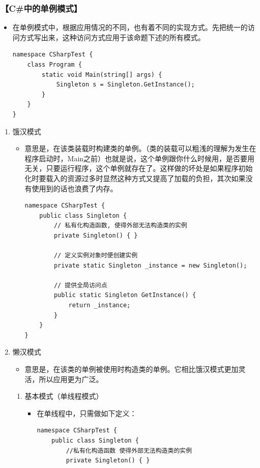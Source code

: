 \documentclass[9pt, b5paper]{article}
\begin{document}
\subsubsection{【C\#中的单例模式】}
\label{sec:org6edd41f}
\begin{itemize}
\item 在单例模式中，根据应用情况的不同，也有着不同的实现方式。先把统一的访问方式写出来，这种访问方式应用于该命题下述的所有模式。
\begin{verbatim}
namespace CSharpTest {
    class Program {
        static void Main(string[] args) {
            Singleton s = Singleton.GetInstance();
        }
    }
}
\end{verbatim}
\end{itemize}
\begin{enumerate}
\item 饿汉模式
\label{sec:org553a765}
\begin{itemize}
\item 意思是，在该类装载时构建类的单例。（类的装载可以粗浅的理解为发生在程序启动时，Main之前）也就是说，这个单例跟你什么时候用，是否要用无关，只要运行程序，这个单例就存在了。这样做的坏处是如果程序初始化时要载入的资源过多时显然这种方式又提高了加载的负担，其次如果没有使用到的话也浪费了内存。
\begin{verbatim}
namespace CSharpTest {
    public class Singleton {
        // 私有化构造函数, 使得外部无法构造类的实例
        private Singleton() { }

        // 定义实例对象时便创建实例
        private static Singleton _instance = new Singleton();

        // 提供全局访问点
        public static Singleton GetInstance() {
            return _instance;
        }
    }
}
\end{verbatim}
\end{itemize}
\item 懒汉模式
\label{sec:orgcdf3c53}
\begin{itemize}
\item 意思是，在该类的单例被使用时构造类的单例。它相比饿汉模式更加灵活，所以应用更为广泛。
\end{itemize}
\begin{enumerate}
\item 基本模式（单线程模式）
\label{sec:orga32e8d9}
\begin{itemize}
\item 在单线程中，只需做如下定义：
\begin{verbatim}
namespace CSharpTest {
    public class Singleton {
        //私有化构造函数 使得外部无法构造类的实例
        private Singleton() { }


\end{verbatim}
\end{itemize}
\end{enumerate}
\end{enumerate}
\end{document}
